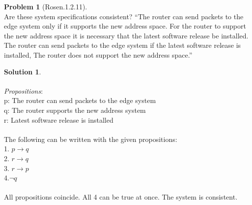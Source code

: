 \documentclass{article}
\theoremstyle{definition}
\newtheorem*{problem}{Problem}
\newtheorem*{solution}{Solution}
\begin{document}
\begin{problem}[Rosen.1.2.11]\ \\
Are these system specifications consistent? “The router
can send packets to the edge system only if it supports the
new address space. For the router to support the new address
space it is necessary that the latest software release
be installed. The router can send packets to the edge system
if the latest software release is installed, The router
does not support the new address space.”
\begin{compactenum}
\renewcommand{\theenumi}{\alph{enumi}}

\end{compactenum}
\end{problem}

\begin{solution}\ \\
\ \\
\textit{Propositions}:\ \\
p: The router can send packets to the edge system\ \\
q: The router supports the new address system\ \\
r: Latest software release is installed\ \\
\ \\
The following can be written with the given propositions:\ \\
1. $p \rightarrow  q$\ \\
2. $r \rightarrow q$\ \\
3. $r \rightarrow p$\ \\
4.$\neg q$ \ \\
\ \\
All propositions coincide. All 4 can be true at once. The system is consistent.
\begin{compactenum}
\renewcommand{\theenumi}{\alph{enumi}}

\end{compactenum}
\end{solution}
\end{document}
